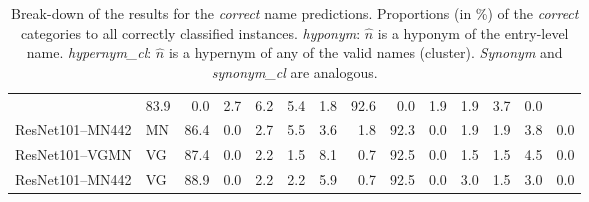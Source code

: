 \begin{table}[t]
\begin{tabular}{llr@{~}|r@{~}r@{~}r@{~}r@{~}r@{~}||r@{~}|r@{~}r@{~}r@{~}r@{~}r@{~}}
		&                  83.9 &              0.0 &                 2.7 &               6.2 &              5.4 &                  1.8 &                  92.6 &              0.0 &                 1.9 &               1.9 &              3.7 &                  0.0 \\
		ResNet101--MN442 & MN %
		&                  86.4 &              0.0 &                 2.7 &               5.5 &              3.6 &                  1.8 &                  92.3 &              0.0 &                 1.9 &               1.9 &              3.8 &                  0.0 \\
		ResNet101--VGMN & VG %
		&                  87.4 &              0.0 &                 2.2 &               1.5 &              8.1 &                  0.7 &                  92.5 &              0.0 &                 1.5 &               1.5 &              4.5 &                  0.0 \\
		ResNet101--MN442 & VG%
		&                  88.9 &              0.0 &                 2.2 &               2.2 &              5.9 &                  0.7 &                  92.5 &              0.0 &                 3.0 &               1.5 &              3.0 &                  0.0 \\
		\bottomrule
	\end{tabular}
	
	\caption{Break-down of the results for the \textit{correct} name predictions. Proportions (in \%) of the \textit{correct} categories to all correctly classified instances.  \textit{hyponym}: $\hat{n}$ is a hyponym of the entry-level name. \textit{hypernym\_cl}: $\hat{n}$ is a hypernym of any of the valid names (cluster). \textit{Synonym} and \textit{synonym\_cl} are analogous. \label{tab:exp_alternatives}}
\end{table}

